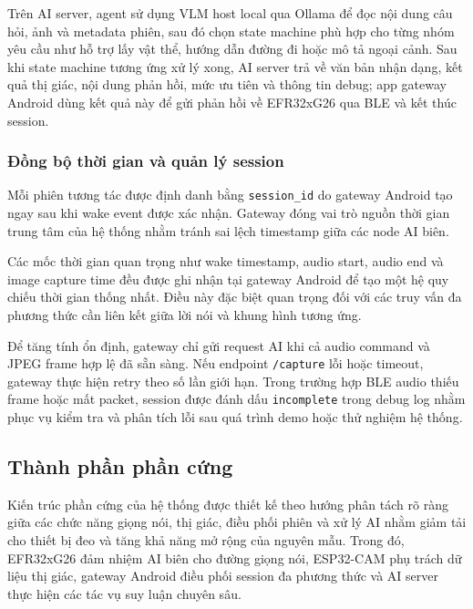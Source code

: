 \documentclass[11pt,a4paper]{article}
\begin{document}
Trên AI server, agent sử dụng VLM host local qua Ollama để đọc nội dung câu hỏi, ảnh và metadata phiên, sau đó chọn state machine phù hợp cho từng nhóm yêu cầu như hỗ trợ lấy vật thể, hướng dẫn đường đi hoặc mô tả ngoại cảnh. Sau khi state machine tương ứng xử lý xong, AI server trả về văn bản nhận dạng, kết quả thị giác, nội dung phản hồi, mức ưu tiên và thông tin debug; app gateway Android dùng kết quả này để gửi phản hồi về EFR32xG26 qua BLE và kết thúc session.

\subsubsection{Đồng bộ thời gian và quản lý session}

Mỗi phiên tương tác được định danh bằng \texttt{session\_id} do gateway Android tạo ngay sau khi wake event được xác nhận. Gateway đóng vai trò nguồn thời gian trung tâm của hệ thống nhằm tránh sai lệch timestamp giữa các node AI biên.

Các mốc thời gian quan trọng như wake timestamp, audio start, audio end và image capture time đều được ghi nhận tại gateway Android để tạo một hệ quy chiếu thời gian thống nhất. Điều này đặc biệt quan trọng đối với các truy vấn đa phương thức cần liên kết giữa lời nói và khung hình tương ứng.

Để tăng tính ổn định, gateway chỉ gửi request AI khi cả audio command và JPEG frame hợp lệ đã sẵn sàng. Nếu endpoint \texttt{/capture} lỗi hoặc timeout, gateway thực hiện retry theo số lần giới hạn. Trong trường hợp BLE audio thiếu frame hoặc mất packet, session được đánh dấu \texttt{incomplete} trong debug log nhằm phục vụ kiểm tra và phân tích lỗi sau quá trình demo hoặc thử nghiệm hệ thống.

\subsection{Thành phần phần cứng}

Kiến trúc phần cứng của hệ thống được thiết kế theo hướng phân tách rõ ràng giữa các chức năng giọng nói, thị giác, điều phối phiên và xử lý AI nhằm giảm tải cho thiết bị đeo và tăng khả năng mở rộng của nguyên mẫu. Trong đó, EFR32xG26 đảm nhiệm AI biên cho đường giọng nói, ESP32-CAM phụ trách dữ liệu thị giác, gateway Android điều phối session đa phương thức và AI server thực hiện các tác vụ suy luận chuyên sâu.
\end{document}
